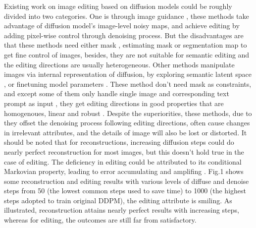 \documentclass[letterpaper]{article} %
\begin{document}
Existing work on image editing based on diffusion models could be roughly divided into two categories. One is through image guidance \cite{nichol2021glide, yang2023paint}, these methods take advantage of diffusion model's image-level noisy maps, and achieve editing by adding pixel-wise control through denoising process. But the disadvantages are that these methods need either mask \cite{avrahami2022blended}, estimating mask \cite{couairon2022diffedit} or segmentation map \cite{matsunaga2022fine} to get fine control of images, besides, they are not suitable for semantic editing and the editing directions are usually heterogeneous. Other methods manipulate images via internal representation of diffusion, by exploring semantic latent space \cite{kwon2022diffusion, preechakul2022diffusion}, or finetuning model parameters \cite{kim2022diffusionclip, kawar2023imagic}. These method don't need mask as constraints, and except some of them only handle single image and corresponding text prompt as input \cite{hertz2022prompt, kawar2023imagic}, they get editing directions in good properties that are homogenoues, linear and robust \cite{kwon2022diffusion}. Despite the superiorities, these methods, due to they offset the denoising process following editing directions, often cause changes in irrelevant attributes, and the details of image will also be lost or distorted. It should be noted that for reconstructions, increasing diffusion steps could do nearly perfect reconstruction for most images, but this doesn't hold true in the case of editing. The deficiency in editing could be attributed to its conditional Markovian property, leading to error accumulating and amplifing \cite{mokady2023null}. Fig.1 shows some reconstruction and editing results with various levels of diffuse and denoise steps from 50 (the lowest common steps used to save time) to 1000 (the highest steps adopted to train original DDPM), the editing attribute is smiling. As illustrated, reconstruction attains nearly perfect results with increasing steps, whereas for editing, the outcomes are still far from satisfactory. 
\end{document}
